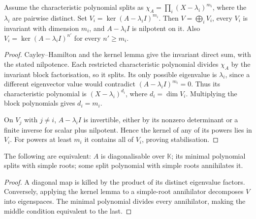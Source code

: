 \begin{theorem}\label{linear:thm:geneigen}
Assume the characteristic polynomial splits as $\chi_A=\prod_i(X-\lambda_i)^{m_i}$, where the $\lambda_i$ are pairwise distinct. Set $V_i=\ker(A-\lambda_i I)^{m_i}$. Then $V=\bigoplus_iV_i$, every $V_i$ is invariant with dimension $m_i$, and $A-\lambda_i I$ is nilpotent on it. Also $V_i=\ker(A-\lambda_i I)^{n'}$ for every $n'\ge m_i$.
\end{theorem}
\begin{proof}
Cayley--Hamilton and the kernel lemma give the invariant direct sum, with the stated nilpotence. Each restricted characteristic polynomial divides $\chi_A$ by the invariant block factorisation, so it splits. Its only possible eigenvalue is $\lambda_i$, since a different eigenvector value would contradict $(A-\lambda_i I)^{m_i}=0$. Thus its characteristic polynomial is $(X-\lambda_i)^{d_i}$, where $d_i=\dim V_i$. Multiplying the block polynomials gives $d_i=m_i$.

On $V_j$ with $j\ne i$, $A-\lambda_i I$ is invertible, either by its nonzero determinant or a finite inverse for scalar plus nilpotent. Hence the kernel of any of its powers lies in $V_i$. For powers at least $m_i$ it contains all of $V_i$, proving stabilisation.
\end{proof}

\begin{corollary}[diagonalisability]\label{linear:cor:diag}
The following are equivalent: $A$ is diagonalisable over $\mathbb K$; its minimal polynomial splits with simple roots; some split polynomial with simple roots annihilates it.
\end{corollary}
\begin{proof}
A diagonal map is killed by the product of its distinct eigenvalue factors. Conversely, applying the kernel lemma to a simple-root annihilator decomposes $V$ into eigenspaces. The minimal polynomial divides every annihilator, making the middle condition equivalent to the last.
\end{proof}

